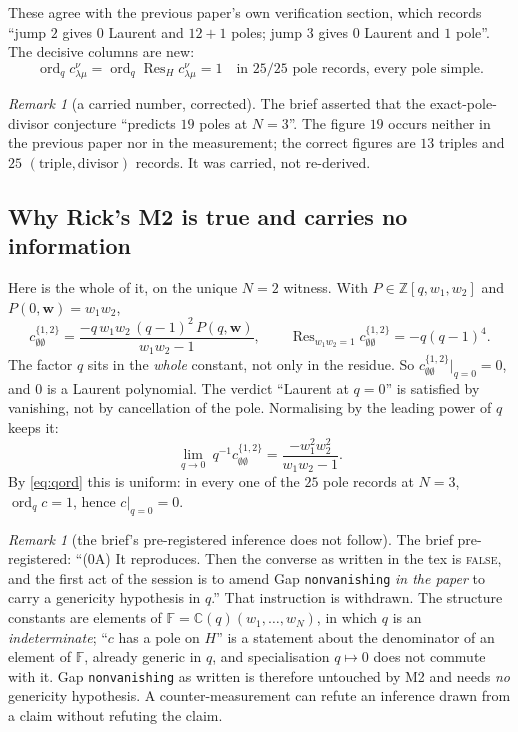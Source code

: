 \documentclass[11pt]{article}
\theoremstyle{plain}
\theoremstyle{definition}
\theoremstyle{remark}
\newtheorem{rem}[thm]{Remark}
\theoremstyle{plain}
\newcommand{\bw}{\mathbf{w}}
\newcommand{\ord}{\operatorname{ord}}
\newcommand{\Res}{\operatorname{Res}}
\begin{document}
These agree with the previous paper's own verification section, which records
``jump $2$ gives $0$ Laurent and $12+1$ poles; jump $3$ gives $0$ Laurent and
$1$ pole''.  The decisive columns are new:
\begin{equation}
\ord_q c^{\nu}_{\lambda\mu}=\ord_q\Res_{H}c^{\nu}_{\lambda\mu}=1
\quad\text{in }25/25\text{ pole records, every pole simple.}
\label{eq:qord}
\end{equation}

\begin{rem}[a carried number, corrected]
The brief asserted that the exact-pole-divisor conjecture ``predicts $19$ poles
at $N=3$''.  The figure $19$ occurs neither in the previous paper nor in the
measurement; the correct figures are $13$ triples and $25$
$(\text{triple},\text{divisor})$ records.  It was carried, not re-derived.
\end{rem}

\subsection{Why Rick's M2 is true and carries no information}

Here is the whole of it, on the unique $N=2$ witness.  With
$P\in\mathbb{Z}[q,w_1,w_2]$ and $P(0,\bw)=w_1w_2$,
\[
c^{\{1,2\}}_{\emptyset\emptyset}
=\frac{-q\,w_1w_2\,(q-1)^2\,P(q,\bw)}{w_1w_2-1},
\qquad
\Res_{w_1w_2=1}c^{\{1,2\}}_{\emptyset\emptyset}=-q(q-1)^4 .
\]
The factor $q$ sits in the \emph{whole} constant, not only in the residue.  So
$c^{\{1,2\}}_{\emptyset\emptyset}\big|_{q=0}=0$, and $0$ is a Laurent
polynomial.  The verdict ``Laurent at $q=0$'' is satisfied by vanishing, not by
cancellation of the pole.  Normalising by the leading power of $q$ keeps it:
\[
\lim_{q\to0}\ q^{-1}c^{\{1,2\}}_{\emptyset\emptyset}
=\frac{-w_1^2w_2^2}{w_1w_2-1}.
\]
By \eqref{eq:qord} this is uniform: in every one of the $25$ pole records at
$N=3$, $\ord_q c=1$, hence $c|_{q=0}=0$.

\begin{rem}[the brief's pre-registered inference does not follow]
The brief pre-registered: ``(0A) It reproduces.  Then the converse as written in
the tex is \textsc{false}, and the first act of the session is to amend
Gap \texttt{nonvanishing} \emph{in the paper} to carry a genericity hypothesis
in $q$.''  That instruction is withdrawn.  The structure constants are elements
of $\mathbb{F}=\mathbb{C}(q)(w_1,\dots,w_N)$, in which $q$ is an
\emph{indeterminate}; ``$c$ has a pole on $H$'' is a statement about the
denominator of an element of $\mathbb{F}$, already generic in $q$, and
specialisation $q\mapsto0$ does not commute with it.  Gap
\texttt{nonvanishing} as written is therefore untouched by M2 and needs
\emph{no} genericity hypothesis.  A counter-measurement can refute an inference
drawn from a claim without refuting the claim.
\end{rem}
\end{document}
